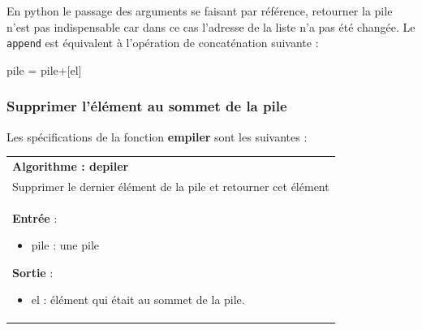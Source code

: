 \documentclass[10pt,fleqn]{article} %
\begin{document}
\begin{rem}
En python le passage des arguments se faisant par référence, retourner la pile n'est pas indispensable car dans ce cas l'adresse de la liste n'a pas été changée.
Le \texttt{append} est équivalent à l'opération de concaténation suivante :
\begin{python}
pile = pile+[el]
\end{python}
\end{rem}

\subsubsection{Supprimer l'élément au sommet de la pile}
Les spécifications de la fonction \textbf{empiler} sont les suivantes :

\begin{tabular}{p{\linewidth}}
\hline
\textbf{Algorithme : depiler} \\
Supprimer le dernier élément de la pile et retourner cet élément\\
\hline
\textbf{Entrée} : 
\begin{itemize}
\item pile : une pile
\end{itemize}
\textbf{Sortie} : 
\begin{itemize}
\item el : élément qui était au sommet de la pile.
\end{itemize} \\
\hline 
\end{tabular}

\vspace{.5cm}
\end{document}
